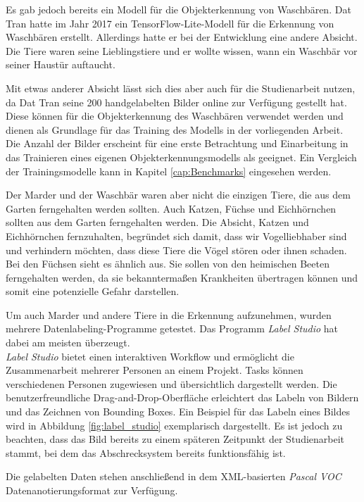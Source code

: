 Es gab jedoch bereits ein Modell für die Objekterkennung von Waschbären. Dat Tran hatte im Jahr 2017 ein TensorFlow-Lite-Modell für die Erkennung von Waschbären erstellt. Allerdings hatte er bei der Entwicklung eine andere Absicht. Die Tiere waren seine Lieblingstiere und er wollte wissen, wann ein Waschbär vor seiner Haustür auftaucht.
\cite{wasch_detect}

Mit etwas anderer Absicht lässt sich dies aber auch für die Studienarbeit nutzen, da Dat Tran seine 200 handgelabelten Bilder online zur Verfügung gestellt hat. Diese können für die Objekterkennung des Waschbären verwendet werden und dienen als Grundlage für das Training des Modells in der vorliegenden Arbeit.\\
Die Anzahl der Bilder erscheint für eine erste Betrachtung und Einarbeitung in das Trainieren eines eigenen Objekterkennungsmodells als geeignet. Ein Vergleich der Trainingsmodelle kann in Kapitel \ref{cap:Benchmarks} eingesehen werden.

Der Marder und der Waschbär waren aber nicht die einzigen Tiere, die aus dem Garten ferngehalten werden sollten. Auch Katzen, Füchse und Eichhörnchen sollten aus dem Garten ferngehalten werden. Die Absicht, Katzen und Eichhörnchen fernzuhalten, begründet sich damit, dass wir Vogelliebhaber sind und verhindern möchten, dass diese Tiere die Vögel stören oder ihnen schaden.
\\
Bei den Füchsen sieht es ähnlich aus. Sie sollen von den heimischen Beeten ferngehalten werden, da sie bekanntermaßen Krankheiten übertragen können und somit eine potenzielle Gefahr darstellen.

Um auch Marder und andere Tiere in die Erkennung aufzunehmen, wurden mehrere Datenlabeling-Programme getestet. Das Programm \textit{Label Studio} hat dabei am meisten überzeugt.
\\
\textit{Label Studio} bietet einen interaktiven Workflow und ermöglicht die Zusammenarbeit mehrerer Personen an einem Projekt. Tasks können verschiedenen Personen zugewiesen und übersichtlich dargestellt werden. Die benutzerfreundliche Drag-and-Drop-Oberfläche erleichtert das Labeln von Bildern und das Zeichnen von Bounding Boxes. Ein Beispiel für das Labeln eines Bildes wird in Abbildung \ref{fig:label_studio} exemplarisch dargestellt. Es ist jedoch zu beachten, dass das Bild bereits zu einem späteren Zeitpunkt der Studienarbeit stammt, bei dem das Abschrecksystem bereits funktionsfähig ist. \cite{labelstudio}

Die gelabelten Daten stehen anschließend in dem XML-basierten \textit{Pascal VOC} Datenanotierungsformat zur Verfügung.

